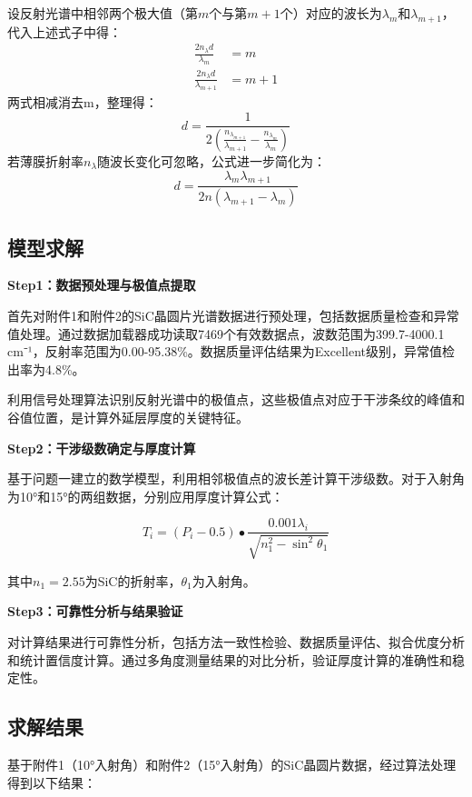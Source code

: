 \documentclass[withoutpreface,bwprint]{cumcmthesis}
\begin{document}
设反射光谱中相邻两个极大值（第$m$个与第$m+1$个）对应的波长为$\lambda_m$和$\lambda_{m+1}$，代入上述式子中得：
\begin{align}
\frac{2n_\lambda d}{\lambda_m} &= m \\
\frac{2n_\lambda d}{\lambda_{m+1}} &= m+1
\end{align}
两式相减消去m，整理得：
\begin{equation}d=\frac{1}{2\left(\frac{n_{\lambda_{m+1}}}{\lambda_{m+1}}-\frac{n_{\lambda_m}}{\lambda_m}\right)}\end{equation}
若薄膜折射率$n_{\lambda}$随波长变化可忽略，公式进一步简化为：
\begin{equation}d=\frac{\lambda_m\lambda_{m+1}}{2n(\lambda_{m+1}-\lambda_m)}\end{equation}


\subsection{模型求解}

\textbf{Step1：数据预处理与极值点提取} 

首先对附件1和附件2的SiC晶圆片光谱数据进行预处理，包括数据质量检查和异常值处理。通过数据加载器成功读取7469个有效数据点，波数范围为399.7-4000.1 cm⁻¹，反射率范围为0.00-95.38\%。数据质量评估结果为Excellent级别，异常值检出率为4.8\%。

利用信号处理算法识别反射光谱中的极值点，这些极值点对应于干涉条纹的峰值和谷值位置，是计算外延层厚度的关键特征。

\textbf{Step2：干涉级数确定与厚度计算} 

基于问题一建立的数学模型，利用相邻极值点的波长差计算干涉级数。对于入射角为10°和15°的两组数据，分别应用厚度计算公式：

$$T_i=(P_i-0.5)\bullet\frac{0.001\lambda_i}{\sqrt{n_1^2-\sin^2\theta_1}}$$

其中$n_1=2.55$为SiC的折射率，$\theta_1$为入射角。

\textbf{Step3：可靠性分析与结果验证} 

对计算结果进行可靠性分析，包括方法一致性检验、数据质量评估、拟合优度分析和统计置信度计算。通过多角度测量结果的对比分析，验证厚度计算的准确性和稳定性。

\subsection{求解结果}

基于附件1（10°入射角）和附件2（15°入射角）的SiC晶圆片数据，经过算法处理得到以下结果：
\end{document}
